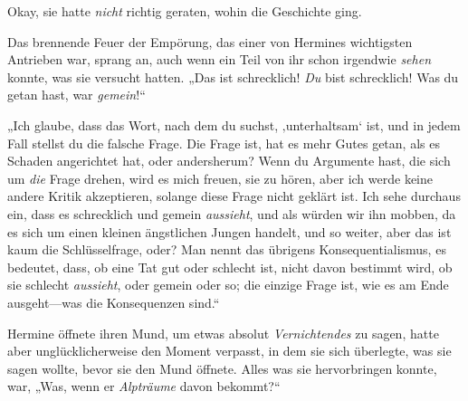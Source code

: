 Okay, sie hatte \emph{nicht} richtig geraten, wohin die Geschichte ging.

Das brennende Feuer der Empörung, das einer von Hermines wichtigsten Antrieben war, sprang an, auch wenn ein Teil von ihr schon irgendwie \emph{sehen} konnte, was sie versucht hatten. „Das ist schrecklich! \emph{Du} bist schrecklich! Was du getan hast, war \emph{gemein}!“

„Ich glaube, dass das Wort, nach dem du suchst, ‚unterhaltsam‘ ist, und in jedem Fall stellst du die falsche Frage. Die Frage ist, hat es mehr Gutes getan, als es Schaden angerichtet hat, oder andersherum? Wenn du Argumente hast, die sich um \emph{die} Frage drehen, wird es mich freuen, sie zu hören, aber ich werde keine andere Kritik akzeptieren, solange diese Frage nicht geklärt ist. Ich sehe durchaus ein, dass es schrecklich und gemein \emph{aussieht}, und als würden wir ihn mobben, da es sich um einen kleinen ängstlichen Jungen handelt, und so weiter, aber das ist kaum die Schlüsselfrage, oder? Man nennt das übrigens Konsequentialismus, es bedeutet, dass, ob eine Tat gut oder schlecht ist, nicht davon bestimmt wird, ob sie schlecht \emph{aussieht}, oder gemein oder so; die einzige Frage ist, wie es am Ende ausgeht—was die Konsequenzen sind.“

Hermine öffnete ihren Mund, um etwas absolut \emph{Vernichtendes} zu sagen, hatte aber unglücklicherweise den Moment verpasst, in dem sie sich überlegte, was sie sagen wollte, bevor sie den Mund öffnete. Alles was sie hervorbringen konnte, war, „Was, wenn er \emph{Alpträume} davon bekommt?“

